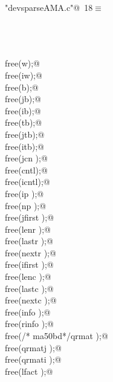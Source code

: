 \documentclass[12pt]{article}
\begin{document}
\begin{flushleft} \small
\begin{minipage}{\linewidth}\label{scrap5}\raggedright\small
{} \verb@"devsparseAMA.c"@\nobreak\ {\footnotesize {18}}$\equiv$
\vspace{-1ex}
\begin{list}{}{} \item
\mbox{}\verb@@\\
\mbox{}\verb@@\\
\mbox{}\verb@@\\
\mbox{}\verb@        free(w);@\\
\mbox{}\verb@        free(iw);@\\
\mbox{}\verb@        free(b);@\\
\mbox{}\verb@        free(jb);@\\
\mbox{}\verb@        free(ib);@\\
\mbox{}\verb@        free(tb);@\\
\mbox{}\verb@        free(jtb);@\\
\mbox{}\verb@        free(itb);@\\
\mbox{}\verb@        free(jcn );@\\
\mbox{}\verb@        free(cntl);@\\
\mbox{}\verb@        free(icntl);@\\
\mbox{}\verb@        free(ip );@\\
\mbox{}\verb@        free(np );@\\
\mbox{}\verb@        free(jfirst );@\\
\mbox{}\verb@        free(lenr );@\\
\mbox{}\verb@        free(lastr );@\\
\mbox{}\verb@        free(nextr );@\\
\mbox{}\verb@        free(ifirst );@\\
\mbox{}\verb@        free(lenc );@\\
\mbox{}\verb@        free(lastc );@\\
\mbox{}\verb@        free(nextc );@\\
\mbox{}\verb@        free(info );@\\
\mbox{}\verb@        free(rinfo );@\\
\mbox{}\verb@        free(/* ma50bd*/qrmat );@\\
\mbox{}\verb@        free(qrmatj );@\\
\mbox{}\verb@        free(qrmati );@\\
\mbox{}\verb@        free(lfact );@\\

\end{list}
\end{minipage}
\end{flushleft}
\end{document}
